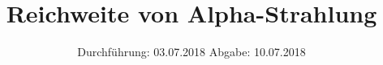 

\subject{Versuch 701}
\title{Reichweite von Alpha-Strahlung}
\date{%
  Durchführung: 03.07.2018
  \hspace{3em}
  Abgabe: 10.07.2018
}



\maketitle
\thispagestyle{empty}
\tableofcontents
\newpage






\printbibliography{}


